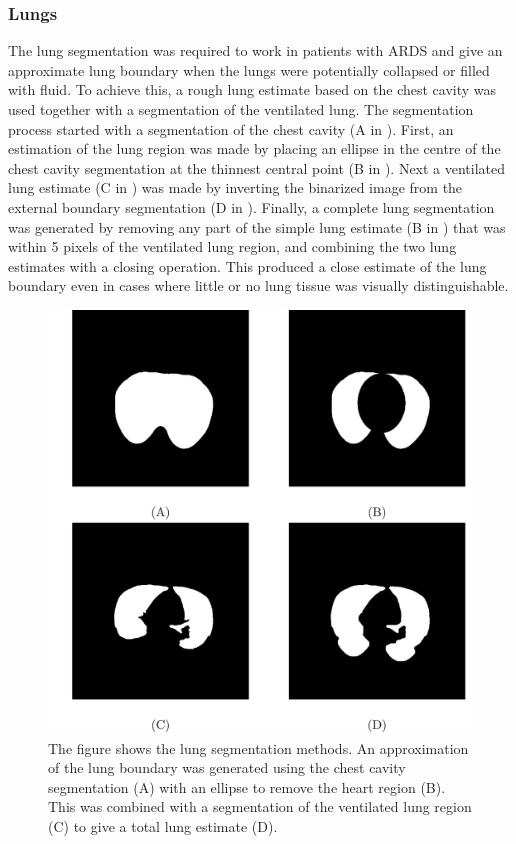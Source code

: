 \subsubsection{Lungs}
The lung segmentation was required to work in patients with ARDS and give 
an approximate lung boundary when the lungs were potentially collapsed or filled with 
fluid. To achieve this, a rough lung estimate based on the chest cavity  
was used together with a segmentation of the 
ventilated lung.
The segmentation process started with a segmentation of the chest cavity (A in ).
First, an estimation of the lung region was made by placing an ellipse
in the centre of the chest cavity segmentation at the thinnest central
point (B in ). Next a ventilated lung estimate 
(C in )
was made
by inverting the binarized image from the external boundary segmentation
(D in ). 
Finally, a complete lung segmentation was generated by removing any part of the
simple lung estimate (B in ) that was within 5 
pixels of the ventilated lung region, and combining the two 
lung estimates with a closing operation. 
This produced a close estimate of the lung boundary even in cases where
little or no lung tissue was visually distinguishable. 

\begin{figure}
	\centering
	\includegraphics[width=\textwidth]{chapter5-CT_to_mesh/imgs/lung_seg_methods.pdf}
	\caption[Lung segmentation methods.]{\label{fig:lung_seg_methods}%
	The figure shows the lung segmentation methods.
	An approximation of the lung boundary was generated using the chest cavity segmentation
	(A) with an ellipse to remove the heart region (B).
	This was combined with a segmentation of the ventilated lung region (C) 
	to give a total lung estimate (D).
	}
\end{figure}

